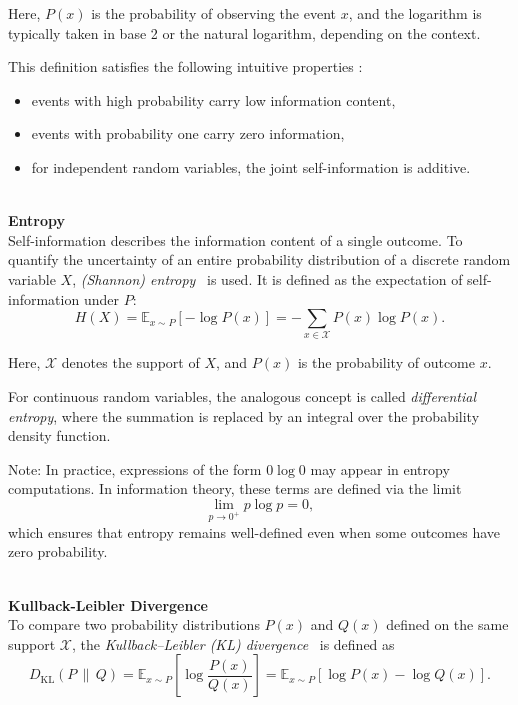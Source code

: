 Here, $P(x)$ is the probability of observing the event $x$, and the logarithm is typically taken in base 2 or the natural logarithm, depending on the context.

This definition satisfies the following intuitive properties \cite{goodfellow2016}:
\begin{itemize}
    \item events with high probability carry low information content,
    \item events with probability one carry zero information,
    \item for independent random variables, the joint self-information is additive.
\end{itemize}

\textbf{\\Entropy\\}
Self-information describes the information content of a single outcome. To quantify the uncertainty of an entire probability distribution of a discrete random variable $X$, \emph{(Shannon) entropy}~\cite{shannon1948} is used. It is defined as the expectation of self-information under $P$:
\begin{equation*}
H(X) = \mathbb{E}_{x \sim P}[-\log P(x)] = - \sum_{x \in \mathcal{X}} P(x)\log P(x).
\end{equation*}

Here, $\mathcal{X}$ denotes the support of $X$, and $P(x)$ is the probability of outcome $x$.

For continuous random variables, the analogous concept is called \emph{differential entropy}, where the summation is replaced by an integral over the probability density function.

Note: In practice, expressions of the form $0 \log 0$ may appear in entropy computations. In information theory, these terms are defined via the limit
\begin{equation*}
\lim_{p \to 0^+} p \log p = 0,
\end{equation*}
which ensures that entropy remains well-defined even when some outcomes have zero probability.

\textbf{\\Kullback-Leibler Divergence\\}
To compare two probability distributions $P(x)$ and $Q(x)$ defined on the same support $\mathcal{X}$, the \emph{Kullback--Leibler (KL) divergence}~\cite{kullback1951} is defined as
\begin{equation*}
D_{\mathrm{KL}}(P \,\|\, Q) = \mathbb{E}_{x \sim P} \left[ \log \frac{P(x)}{Q(x)} \right] = \mathbb{E}_{x \sim P} [\log P(x) - \log Q(x)].
\end{equation*}

